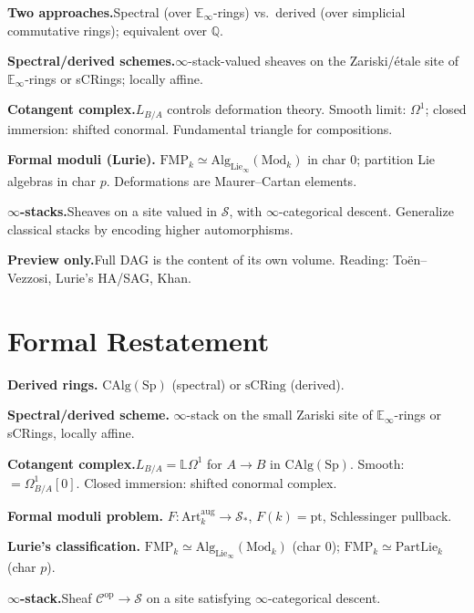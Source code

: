 \begin{summarybox}
\textbf{Two approaches.}\quad Spectral (over $\mathbb{E}_\infty$-rings)
vs.\ derived (over simplicial commutative rings); equivalent over
$\mathbb{Q}$.

\textbf{Spectral/derived schemes.}\quad $\infty$-stack-valued sheaves on
the Zariski/étale site of $\mathbb{E}_\infty$-rings or sCRings; locally
affine.

\textbf{Cotangent complex.}\quad $L_{B/A}$ controls deformation theory.
Smooth limit: $\Omega^1$; closed immersion: shifted conormal. Fundamental
triangle for compositions.

\textbf{Formal moduli (Lurie).}\quad
$\mathrm{FMP}_k \simeq \mathrm{Alg}_{\mathrm{Lie}_\infty}(\mathrm{Mod}_k)$
in char 0; partition Lie algebras in char $p$. Deformations are
Maurer–Cartan elements.

\textbf{$\infty$-stacks.}\quad Sheaves on a site valued in $\mathcal{S}$,
with $\infty$-categorical descent. Generalize classical stacks by
encoding higher automorphisms.

\textbf{Preview only.}\quad Full DAG is the content of its own volume.
Reading: Toën–Vezzosi, Lurie's HA/SAG, Khan.
\end{summarybox}


\section*{Formal Restatement}

\begin{formalrestatement}
\textbf{Derived rings.}\quad
$\mathrm{CAlg}(\mathrm{Sp})$ (spectral) or $\mathrm{sCRing}$ (derived).

\medskip
\textbf{Spectral/derived scheme.}\quad
$\infty$-stack on the small Zariski site of $\mathbb{E}_\infty$-rings or
sCRings, locally affine.

\medskip
\textbf{Cotangent complex.}\quad $L_{B/A} = \mathbb{L} \Omega^1$ for
$A \to B$ in $\mathrm{CAlg}(\mathrm{Sp})$. Smooth: $= \Omega^1_{B/A}[0]$.
Closed immersion: shifted conormal complex.

\medskip
\textbf{Formal moduli problem.}\quad
$F : \mathrm{Art}_k^{\mathrm{aug}} \to \mathcal{S}_*$, $F(k) = \mathrm{pt}$,
Schlessinger pullback.

\medskip
\textbf{Lurie's classification.}\quad
$\mathrm{FMP}_k \simeq \mathrm{Alg}_{\mathrm{Lie}_\infty}(\mathrm{Mod}_k)$ (char 0);
$\mathrm{FMP}_k \simeq \mathrm{PartLie}_k$ (char $p$).

\medskip
\textbf{$\infty$-stack.}\quad Sheaf $\mathcal{C}^{\mathrm{op}} \to \mathcal{S}$
on a site satisfying $\infty$-categorical descent.
\end{formalrestatement}

